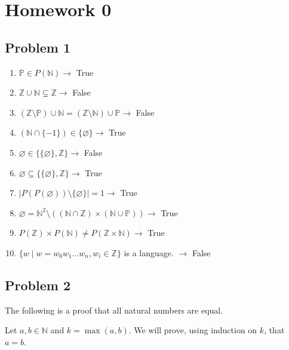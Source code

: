 \documentclass{article}
\begin{document}
\section*{Homework 0}

\subsection*{Problem 1}

\begin{enumerate}[1)]

            \item $\mathbb{P} \in P(\mathbb{N}) \rightarrow$ True
        \item $\mathbb{Z}\cup \mathbb{N} \subsetneq \mathbb{Z} \rightarrow$ False
            \item $(\mathbb{Z} \setminus \mathbb{P}) \cup \mathbb{N} = 
                (\mathbb{Z} \setminus \mathbb{N}) \cup \mathbb{P}\rightarrow$ False

      \item $(\mathbb{N}\cap \{-1\}) \in \{\varnothing\}\rightarrow$ True
            \item $\varnothing \in \{\{\varnothing\}, \mathbb{Z}\}\rightarrow$ False
            \item $\varnothing \subseteq \{\{\varnothing\}, \mathbb{Z}\}\rightarrow$ True
            \item $|P(P(\varnothing)) \setminus \{\varnothing\}|=1\rightarrow$ True
        \item $\varnothing = \mathbb{N}^2 \setminus ((\mathbb{N} \cap \mathbb{Z} )
        \times (\mathbb{N} \cup \mathbb{P}))\rightarrow$ True

            \item $P(\mathbb{Z}) \times P(\mathbb{N}) \neq P(\mathbb{Z} \times \mathbb{N})\rightarrow$ True
            \item $\{w\mid w=w_{0}w_{1}...w_{n},w_{i} \in \mathbb{Z}\}$ is a language. $\rightarrow$ False
\end{enumerate}

\pagebreak
\subsection*{Problem 2}

    The following is a proof that all natural numbers are equal.

    Let $a,b\in\mathbb{N}$ and $k = \max(a,b)$. We will prove, using induction on $k$, that $a = b$.
\end{document}
